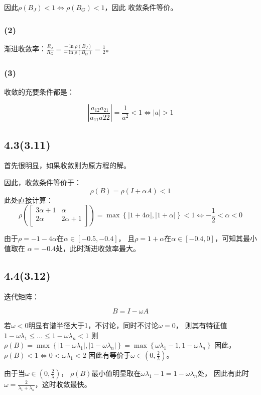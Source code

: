 \documentclass[UTF8,zihao=5]{ctexart}
\begin{document}
因此$\rho(B_J)<1\Leftrightarrow\rho(B_G)<1$，因此
收敛条件等价。

\subsubsection*{(2)}

渐进收敛率：$\frac{R_J}{R_G}=\frac{-\ln\rho(B_J)}{-\ln\rho(B_G)}=\frac{1}{2}$。

\subsubsection*{(3)}
收敛的充要条件都是：

$$
    \left|\frac{a_{12}a_{21}}{a_{11}a{22}}\right|
    =\frac{1}{a^2}<1\Leftrightarrow
    |a| >1
$$

\subsection*{4.3(3.11)}

首先很明显，如果收敛则为原方程的解。

因此，收敛条件等价于：
$$
    \rho(B)=\rho(I+\alpha A)<1
$$
此处直接计算：
$$
    \rho\left(
    \begin{bmatrix}
            3\alpha + 1 & \alpha      \\
            2\alpha     & 2\alpha + 1 \\
        \end{bmatrix}
    \right) = \max\left\{
    |1+4\alpha|, |1+\alpha|
    \right\}<1
    \Leftrightarrow
    -\frac{1}{2}<\alpha<0
$$

由于$\rho=-1-4\alpha$在$\alpha\in[-0.5,-0.4]$，
且$\rho=1+\alpha$在$\alpha\in[-0.4,0]$，可知其最小值取在
$\alpha=-0.4$处，此时渐进收敛率最大。   


\subsection*{4.4(3.12)}
迭代矩阵：

$$
B=I-\omega A
$$

若$\omega<0$明显有谱半径大于1，不讨论，同时不讨论$\omega=0$，
则其有特征值$1-\omega\lambda_1\leq ...\leq 1-\omega\lambda_n<1$
则$\rho(B)=\max\left\{|1-\omega\lambda_1|,|1-\omega\lambda_n|\right\}=\max\left\{\omega\lambda_1-1,1-\omega\lambda_n\right\}$
因此，$\rho(B)<1\Leftrightarrow  0<\omega \lambda_1<2$
因此有等价于$\omega\in\left(0,\frac{2}{\lambda}\right)$。

由于当$\omega\in\left(0,\frac{2}{\lambda}\right)$，
$\rho(B)$最小值明显取在$\omega\lambda_1-1=1-\omega\lambda_n$处，
因此有此时$\omega=\frac{2}{\lambda_1+\lambda_n}$，这时收敛最快。
\end{document}
